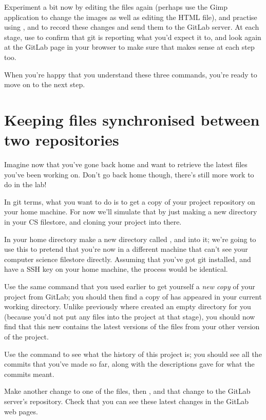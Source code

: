 Experiment a bit now by editing the files again (perhaps use the Gimp application to change the images as well as editing the HTML file), and practise using ,  and  to record these changes and send them to the GitLab server. At each stage, use  to confirm that git is reporting what you'd expect it to, and look again at the GitLab page in your browser to make sure that makes sense at each step too. 

When you're happy that you understand these three commands, you're ready to move on to the next step.

\section{Keeping files synchronised between two repositories}
Imagine now that you've gone back home and want to retrieve the latest files you've been working on. Don't go back home though, there's still more work to do in the lab! 

In git terms, what you want to do is to get a copy of your project repository on your home machine. For now we'll simulate that by just making a new directory in your CS filestore, and cloning your project into there. 

In your home directory make a new directory called , and  into it; we're going to use this to pretend that you're now in a different machine that can't see your computer science filestore directly. Assuming that you've got git installed, and have a SSH key on your home machine, the process would be identical.

Use the same  command that you used earlier to get yourself a \emph{new copy} of your  project from GitLab; you should then find a copy of  has appeared in your current working directory. Unlike previously where  created an empty directory for you (because you'd not put any files into the project at that stage), you should now find that this new  contains the latest versions of the files from your other version of the project.

Use the  command to see what the history of this project is; you should see all the commits that you've made so far, along with the descriptions gave for what the commits meant. 

Make another change to one of the files, then ,  and  that change to the GitLab server's repository. Check that you can see these latest changes in the GitLab web pages.

